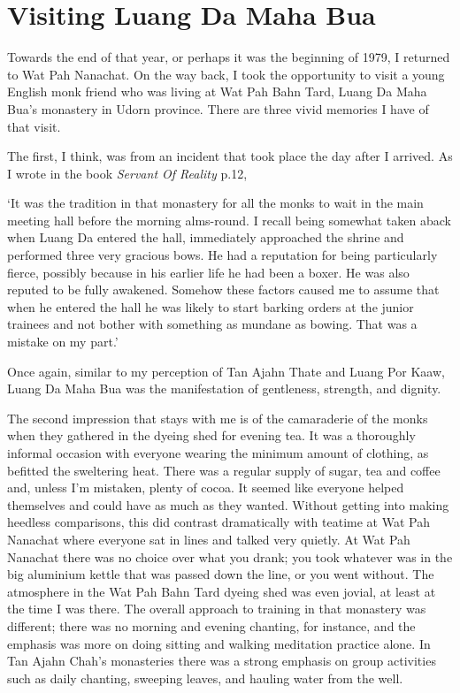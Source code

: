 \chapter{Visiting Luang Da Maha Bua}

Towards the end of that year, or perhaps it was the beginning of 1979, I
returned to Wat Pah Nanachat. On the way back, I took the opportunity to
visit a young English monk friend who was living at Wat Pah Bahn Tard,
Luang Da Maha Bua's monastery in Udorn province. There are three vivid
memories I have of that visit.

The first, I think, was from an incident that took place the day after I
arrived. As I wrote in the book \emph{Servant Of Reality}\cite{servant} p.12,

`It was the tradition in that monastery for all the monks to wait in the
main meeting hall before the morning alms-round. I recall being somewhat
taken aback when Luang Da entered the hall, immediately approached the
shrine and performed three very gracious bows. He had a reputation for
being particularly fierce, possibly because in his earlier life he had
been a boxer. He was also reputed to be fully awakened. Somehow these
factors caused me to assume that when he entered the hall he was likely
to start barking orders at the junior trainees and not bother with
something as mundane as bowing. That was a mistake on my part.'

Once again, similar to my perception of Tan Ajahn Thate and Luang Por
Kaaw, Luang Da Maha Bua was the manifestation of gentleness, strength,
and dignity.

The second impression that stays with me is of the camaraderie of the
monks when they gathered in the dyeing shed for evening tea. It was a
thoroughly informal occasion with everyone wearing the minimum amount of
clothing, as befitted the sweltering heat. There was a regular supply of
sugar, tea and coffee and, unless I'm mistaken, plenty of cocoa. It
seemed like everyone helped themselves and could have as much as they
wanted. Without getting into making heedless comparisons, this did
contrast dramatically with teatime at Wat Pah Nanachat where everyone
sat in lines and talked very quietly. At Wat Pah Nanachat there was no
choice over what you drank; you took whatever was in the big aluminium
kettle that was passed down the line, or you went without. The
atmosphere in the Wat Pah Bahn Tard dyeing shed was even jovial, at
least at the time I was there. The overall approach to training in that
monastery was different; there was no morning and evening chanting, for
instance, and the emphasis was more on doing sitting and walking
meditation practice alone. In Tan Ajahn Chah's monasteries there was a
strong emphasis on group activities such as daily chanting, sweeping
leaves, and hauling water from the well.

